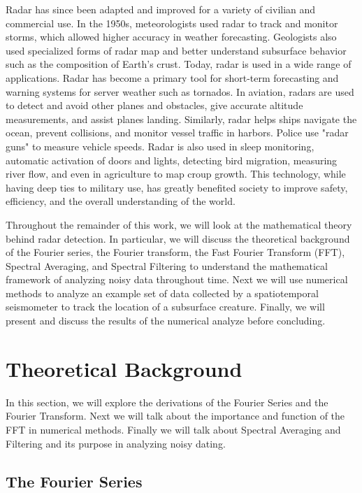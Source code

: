 \documentclass[12pt]{article}%
\numberwithin{equation}{subsection}
\begin{document}
Radar has since been adapted and improved for a variety of civilian and commercial use. In the 1950s, meteorologists used radar to track and monitor storms, which allowed higher accuracy in weather forecasting. Geologists also used specialized forms of radar map and better understand subsurface behavior such as the composition of Earth's crust. Today, radar is used in a wide range of applications. Radar has become a primary tool for short-term forecasting and warning systems for server weather such as tornados. In aviation, radars are used to detect and avoid other planes and obstacles, give accurate altitude measurements, and assist planes landing. Similarly, radar helps ships navigate the ocean, prevent collisions, and monitor vessel traffic in harbors. Police use "radar guns" to measure vehicle speeds. Radar is also used in sleep monitoring, automatic activation of doors and lights, detecting bird migration, measuring river flow, and even in agriculture to map croup growth. This technology, while having deep ties to military use, has greatly benefited society to improve safety, efficiency, and the overall understanding of the world.      

\bigskip
\bigskip

Throughout the remainder of this work, we will look at the mathematical theory behind radar detection. In particular, we will discuss the theoretical background of the Fourier series, the Fourier transform, the Fast Fourier Transform (FFT), Spectral Averaging, and Spectral Filtering to understand the mathematical framework of analyzing noisy data throughout time. Next we will use numerical methods to analyze an example set of data collected by a spatiotemporal seismometer to track the location of a subsurface creature. Finally, we will present and discuss the results of the numerical analyze before concluding.


\section{Theoretical Background}

In this section, we will explore the derivations of the Fourier Series and the Fourier Transform. Next we will talk about the importance and function of the FFT in numerical methods. Finally we will talk about Spectral Averaging and Filtering and its purpose in analyzing noisy dating. 


\subsection{The Fourier Series}
\end{document}
